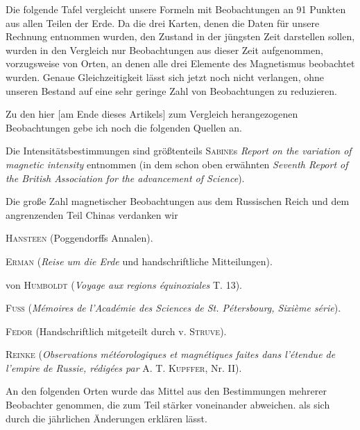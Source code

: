 Die folgende Tafel vergleicht unsere Formeln mit Beobachtungen an 91 Punkten aus allen Teilen der Erde. Da die drei Karten, denen die Daten für unsere Rechnung entnommen wurden, den Zustand in der jüngsten Zeit darstellen sollen, wurden in den Vergleich nur Beobachtungen aus dieser Zeit aufgenommen, vorzugsweise von Orten, an denen alle drei Elemente des Magnetismus beobachtet wurden. Genaue Gleichzeitigkeit lässt sich jetzt noch nicht verlangen, ohne unseren Bestand auf eine sehr geringe Zahl von Beobachtungen zu reduzieren.

Zu den hier [am Ende dieses Artikels] zum Vergleich herangezogenen Beobachtungen gebe ich noch die folgenden Quellen an.

Die Intensitätsbestimmungen sind größtenteils \textsc{Sabine}s \textit{Report on the variation of magnetic intensity} entnommen (in dem schon oben erwähnten \textit{Seventh Report of the British Association for the advancement of Science}).

Die große Zahl magnetischer Beobachtungen aus dem Russischen Reich und dem angrenzenden Teil Chinas verdanken wir

\noindent\hspace*{1em}\textsc{Hansteen} (Poggendorffs Annalen).\par
\noindent\hspace*{1em}\textsc{Erman} (\textit{Reise um die Erde} und handschriftliche Mitteilungen).\par
\noindent\hspace*{1em}von \textsc{Humboldt} (\textit{Voyage aux regions équinoxiales} T. 13).\par
{}
\noindent\hspace*{1em}\textsc{Fuss} (\textit{Mémoires de l'Académie des Sciences de St. Pétersbourg, Sixième série}).\par
\noindent\hspace*{1em}\textsc{Fedor} (Handschriftlich mitgeteilt durch v. \textsc{Struve}).\par
\noindent\hspace*{1em}\textsc{Reinke} (\textit{Observations météorologiques et magnétiques faites dans l'étendue de l'empire de Russie, rédigées par} A. T. \textsc{Kupffer}, Nr. II).\par
An den folgenden Orten wurde das Mittel aus den Bestimmungen mehrerer Beobachter genommen, die zum Teil stärker voneinander abweichen. als sich durch die jährlichen Änderungen erklären lässt.

